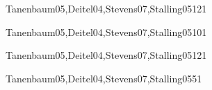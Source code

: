 \begin{syllabus}
\begin{unit}{\NCNetworkedApplicationsDef}{}{Tanenbaum05,Deitel04,Stevens07,Stalling05}{12}{1}
        \NCNetworkedApplicationsAllTopics
        \NCNetworkedApplicationsAllObjectives
\end{unit}

\begin{unit}{\NCNetworkManagementDef}{}{Tanenbaum05,Deitel04,Stevens07,Stalling05}{10}{1}
        \NCNetworkManagementAllTopics
        \NCNetworkManagementAllObjectives
\end{unit}

\begin{unit}{\NCMultimediaTechnologiesDef}{}{Tanenbaum05,Deitel04,Stevens07,Stalling05}{12}{1}
        \NCMultimediaTechnologiesAllTopics
        \NCMultimediaTechnologiesAllObjectives
\end{unit}

\begin{unit}{\NCMobileComputingDef}{}{Tanenbaum05,Deitel04,Stevens07,Stalling05}{5}{1}
        \NCMobileComputingAllTopics
        \NCMobileComputingAllObjectives
\end{unit}

\begin{coursebibliography}
\end{coursebibliography}

\end{syllabus}

%
